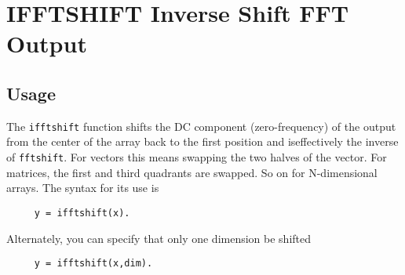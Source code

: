 \section{IFFTSHIFT Inverse Shift FFT Output}

\subsection{Usage}

The \verb|ifftshift| function shifts the DC component (zero-frequency)
of the output from the center of the array back to the first position
and iseffectively the inverse of \verb|fftshift|.  For vectors
this means swapping the two halves of the vector.  For matrices,
the first and third quadrants are swapped.  So on for N-dimensional
arrays.  The syntax for its use is
\begin{verbatim}
     y = ifftshift(x).
\end{verbatim}
Alternately, you can specify that only one dimension be shifted
\begin{verbatim}
     y = ifftshift(x,dim).
\end{verbatim}
